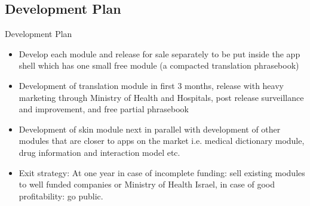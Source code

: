 \documentclass[presentation]{beamer}
\begin{document}
\subsection{Development Plan}
\label{sec-1-6}
\begin{frame}[label=sec-1-6-1]{Development Plan}
\begin{itemize}
\item Develop each module and release for sale separately to be put inside
the app shell which has one small free module (a compacted
translation phrasebook)
\item Development of translation module in first 3 months, release with
heavy marketing through Ministry of Health and Hospitals, post
release surveillance and improvement, and free partial phrasebook
\item Development of skin module next in parallel with development of
other modules that are closer to apps on the market i.e. medical
dictionary module, drug information and interaction model etc.
\item Exit strategy: At one year in case of incomplete funding: sell
existing modules to well funded companies or Ministry of Health
Israel, in case of good profitability: go public.
\end{itemize}
\end{frame}
\end{document}
